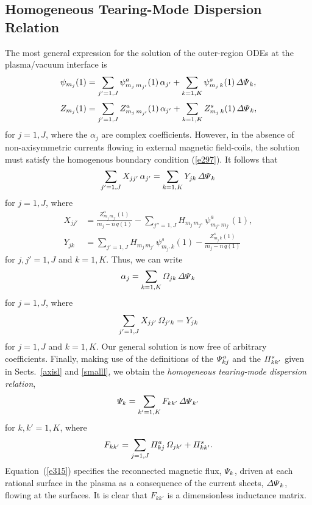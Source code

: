 \documentclass[12pt,prb,aps]{revtex4-1}
\begin{document}
\subsection{Homogeneous Tearing-Mode Dispersion Relation}
The most general expression for the solution of the outer-region ODEs at the plasma/vacuum interface is
\begin{align}\label{e385}
\psi_{m_j}(1) &= \sum_{j'=1,J}\psi_{m_j\,m_{j'}}^a(1)\,\alpha_{j'} + \sum_{k=1,K}\psi_{m_j\,k}^s(1)\,{\mit\Delta\Psi}_k,\\[0.5ex]
Z_{m_j}(1) &= \sum_{j'=1,J}Z_{m_j\,m_{j'}}^a(1)\,\alpha_{j'} + \sum_{k=1,K}Z_{m_j\,k}^s(1)\,{\mit\Delta\Psi}_k,\label{e386}
\end{align}
for $j=1,J$, where the $\alpha_j$ are complex coefficients. However, in the absence of non-axisymmetric currents flowing in  external
magnetic field-coils, the solution must satisfy the homogenous boundary condition (\ref{e297}). 
It follows that
\begin{equation}
\sum_{j'=1,J}X_{jj'}\,\alpha_{j'} = \sum_{k=1,K}Y_{jk}\,{\mit\Delta\Psi}_k
\end{equation}
for $j=1,J$, where
\begin{align}
X_{jj'} &=\frac{Z_{m_j\,m_{j'}}^{a}(1)}{m_j-n\,q(1)}-\sum_{j''=1,J}H_{m_j\,m_{j''}}\,\psi_{m_{j''}\,m_{j'}}^a(1),\\[0.5ex]
Y_{jk} &= \sum_{j'=1,J}H_{m_j\,m_{j'}}\,\psi_{m_{j'}\,k}^{s}(1)-
\frac{Z_{m_j\,k}^s(1)}{m_j-n\,q(1)}
\end{align}
for $j,j'=1,J$ and $k=1,K$. Thus, we can write
\begin{equation}
\alpha_j = \sum_{k=1,K}{\mit\Omega}_{jk}\,{\mit\Delta\Psi}_k
\end{equation}
for $j=1,J$, 
where
\begin{equation}
\sum_{j'=1,J}X_{jj'}\,{\mit\Omega}_{j'k} = Y_{jk}
\end{equation}
for $j=1,J$ and $k=1,K$. Our general solution is now free of arbitrary coefficients.
 Finally, making use of the definitions of the ${\mit\Psi}_{kj}^a$ and the ${\mit\Pi}_{kk'}^s$ given in Sects.~\ref{axisl} and \ref{smalll}, we obtain the {\em homogeneous tearing-mode dispersion relation},\cite{connor,cht,am1,pletz}
\begin{equation}\label{e315}
{\mit\Psi}_k = \sum_{k'=1,K}F_{kk'}\,{\mit\Delta\Psi}_{k'}
\end{equation}
for $k,k'=1,K$, where
\begin{equation}
F_{kk'}=\sum_{j=1,J}{\mit\Pi}^a_{kj}\,{\mit\Omega}_{jk'} + {\mit\Pi}^s_{kk'}.
\end{equation}
Equation~(\ref{e315}) specifies the reconnected magnetic flux, ${\mit\Psi}_k$, driven at each rational surface in the plasma
as a consequence of the current sheets, ${\mit\Delta\Psi}_k$, flowing at the surfaces. It is clear that $F_{kk'}$ is a dimensionless
inductance matrix.\cite{rfbook}
\end{document}
